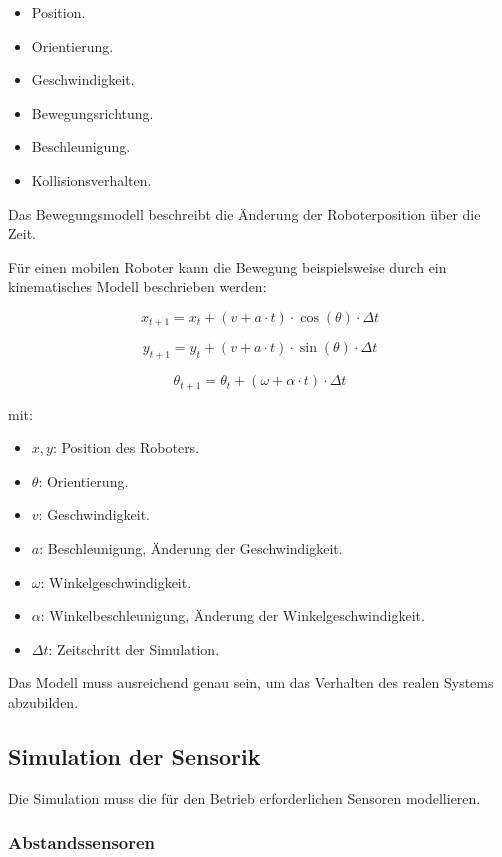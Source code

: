 \begin{itemize}
\tightlist
\item
  Position.
\item
  Orientierung.
\item
  Geschwindigkeit.
\item
  Bewegungsrichtung.
\item
  Beschleunigung.
\item
  Kollisionsverhalten.
\end{itemize}

Das Bewegungsmodell beschreibt die Änderung der Roboterposition über die
Zeit.

Für einen mobilen Roboter kann die Bewegung beispielsweise durch ein
kinematisches Modell beschrieben werden:

\[
x_{t+1}=x_t+\left( v + a \cdot t \right) \cdot \cos(\theta)\cdot \Delta t
\]

\[
y_{t+1}=y_t+\left( v + a \cdot t \right) \cdot \sin(\theta)\cdot \Delta t
\]

\[
\theta_{t+1}=\theta_{t} + \left( \omega + \alpha \cdot t \right) \cdot \Delta t
\]

mit:

\begin{itemize}
\tightlist
\item
  \(x,y\): Position des Roboters.
\item
  \(\theta\): Orientierung.
\item
  \(v\): Geschwindigkeit.
\item
  \(a\): Beschleunigung, Änderung der Geschwindigkeit.
\item
  \(\omega\): Winkelgeschwindigkeit.
\item
  \(\alpha\): Winkelbeschleunigung, Änderung der Winkelgeschwindigkeit.
\item
  \(\Delta t\): Zeitschritt der Simulation.
\end{itemize}

Das Modell muss ausreichend genau sein, um das Verhalten des realen
Systems abzubilden.

\subsection{Simulation der Sensorik}\label{simulation-der-sensorik}

Die Simulation muss die für den Betrieb erforderlichen Sensoren
modellieren.

\subsubsection{Abstandssensoren}\label{abstandssensoren}

